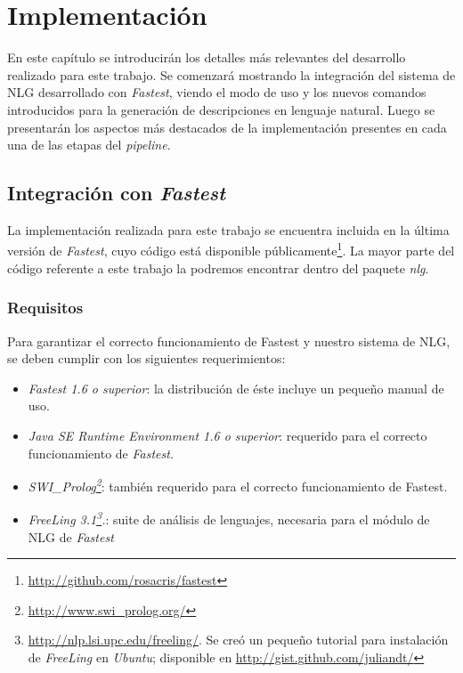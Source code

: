 \chapter{Implementación}
\label{cap:implementacion}

En este capítulo se introducirán los detalles más relevantes del desarrollo realizado para este trabajo. Se comenzará mostrando la integración del sistema de NLG desarrollado con \textit{Fastest}, viendo el modo de uso y los nuevos comandos introducidos para la generación de descripciones en lenguaje natural. Luego se presentarán los aspectos más destacados de la implementación presentes en cada una de las etapas del \emph{pipeline}.

\section{Integración con \emph{Fastest}}

La implementación realizada para este trabajo se encuentra incluida en la última versión de \emph{Fastest}, cuyo código está disponible públicamente\footnote{\url{http://github.com/rosacris/fastest}}. La mayor parte del código referente a este trabajo la podremos encontrar dentro del paquete \textit{nlg}.

\subsection*{Requisitos}

Para garantizar el correcto funcionamiento de Fastest y nuestro sistema de NLG, se deben cumplir con los siguientes requerimientos:

\begin{itemize}
 \item  \emph{Fastest 1.6 o superior}: la distribución de éste incluye un pequeño manual de uso.
 \item  \emph{Java SE Runtime Environment 1.6 o superior}: requerido para el correcto funcionamiento de \emph{Fastest}.
 \item  \emph{SWI\_Prolog\footnote{\url{http://www.swi\_prolog.org/}}}: también requerido para el correcto funcionamiento de Fastest.
 \item  \emph{FreeLing 3.1\footnote{\url{http://nlp.lsi.upc.edu/freeling/}. Se creó un pequeño tutorial para instalación de \emph{FreeLing} en \emph{Ubuntu}; disponible en \url{http://gist.github.com/juliandt/}}.}: suite de análisis de lenguajes, necesaria para el módulo de NLG de \emph{Fastest}
\end{itemize}

